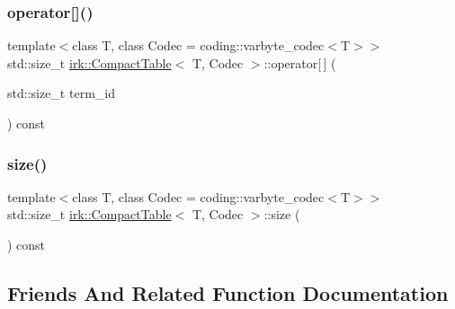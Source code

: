 \mbox{\label{classirk_1_1CompactTable_afc3597fe319993be64bdaabc53863c9b}} 
\subsubsection{\texorpdfstring{operator[]()}{operator[]()}\hspace{0.1cm}{\footnotesize\ttfamily [2/2]}}
{\footnotesize\ttfamily template$<$class T, class Codec = coding\+::varbyte\+\_\+codec$<$\+T$>$$>$ \\
std\+::size\+\_\+t \mbox{\hyperlink{classirk_1_1CompactTable}{irk\+::\+Compact\+Table}}$<$ T, Codec $>$\+::operator\mbox{[}$\,$\mbox{]} (\begin{DoxyParamCaption}\item[{std\+::size\+\_\+t}]{term\+\_\+id }\end{DoxyParamCaption}) const\hspace{0.3cm}{\ttfamily [inline]}}

\mbox{\label{classirk_1_1CompactTable_a9db06db7cac84c926e5cbb5337bef866}} 
\subsubsection{\texorpdfstring{size()}{size()}}
{\footnotesize\ttfamily template$<$class T, class Codec = coding\+::varbyte\+\_\+codec$<$\+T$>$$>$ \\
std\+::size\+\_\+t \mbox{\hyperlink{classirk_1_1CompactTable}{irk\+::\+Compact\+Table}}$<$ T, Codec $>$\+::size (\begin{DoxyParamCaption}{ }\end{DoxyParamCaption}) const\hspace{0.3cm}{\ttfamily [inline]}}



\subsection{Friends And Related Function Documentation}
\mbox{\label{classirk_1_1CompactTable_aca625eae690396584a3998222ddd856f}} 
